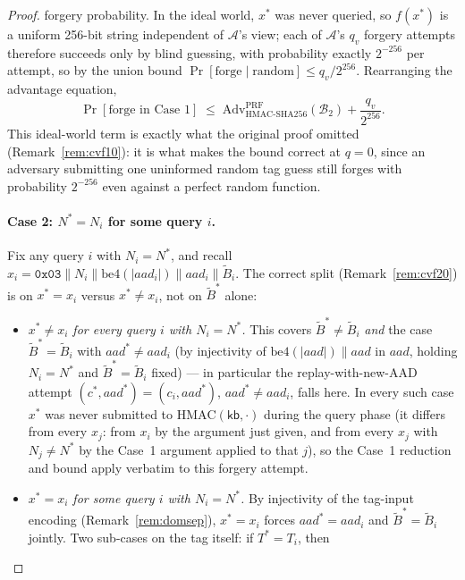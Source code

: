 \documentclass[11pt,a4paper]{article}
\begin{document}
\begin{proof}
forgery probability. In the ideal world, $x^*$ was never queried, so
$f(x^*)$ is a uniform 256-bit string independent of $\mathcal{A}$'s view;
each of $\mathcal{A}$'s $q_v$ forgery attempts therefore succeeds only by
blind guessing, with probability exactly $2^{-256}$ per attempt, so by the
union bound $\Pr[\text{forge}\mid\text{random}] \leq q_v/2^{256}$.
Rearranging the advantage equation,
\[
  \Pr[\text{forge in Case 1}]
  \;\leq\;
  \mathrm{Adv}^{\mathrm{PRF}}_{\mathrm{HMAC\text{-}SHA256}}(\mathcal{B}_2)
  + \frac{q_v}{2^{256}}.
\]
This ideal-world term is exactly what the original proof omitted
(Remark~\ref{rem:cvf10}): it is what makes the bound correct at $q=0$,
since an adversary submitting one uninformed random tag guess still
forges with probability $2^{-256}$ even against a perfect random
function.

\paragraph{Case 2: $N^* = N_i$ for some query $i$.}
Fix any query $i$ with $N_i = N^*$, and recall
$x_i = \texttt{0x03} \| N_i \| \mathrm{be4}(|aad_i|) \| aad_i \| \widetilde{B}_i$.
The correct split (Remark~\ref{rem:cvf20}) is on $x^* = x_i$ versus
$x^* \neq x_i$, not on $\widetilde{B}^*$ alone:
\begin{itemize}
  \item \emph{$x^* \neq x_i$ for every query $i$ with $N_i = N^*$.} This
        covers $\widetilde{B}^* \neq \widetilde{B}_i$ \emph{and} the
        case $\widetilde{B}^* = \widetilde{B}_i$ with $aad^* \neq aad_i$
        (by injectivity of $\mathrm{be4}(|aad|)\|aad$ in $aad$, holding
        $N_i=N^*$ and $\widetilde{B}^*=\widetilde{B}_i$ fixed) --- in
        particular the replay-with-new-AAD attempt
        $(c^*,aad^*)=(c_i,aad^*)$, $aad^*\neq aad_i$, falls here. In every
        such case $x^*$ was never submitted to
        $\mathrm{HMAC}(\mathsf{kb},\cdot)$ during the query phase (it
        differs from every $x_j$: from $x_i$ by the argument just given,
        and from every $x_j$ with $N_j \neq N^*$ by the Case~1 argument
        applied to that $j$), so the Case~1 reduction and bound apply
        verbatim to this forgery attempt.
  \item \emph{$x^* = x_i$ for some query $i$ with $N_i = N^*$.} By
        injectivity of the tag-input encoding (Remark~\ref{rem:domsep}),
        $x^*=x_i$ forces $aad^*=aad_i$ and $\widetilde{B}^*=\widetilde{B}_i$
        jointly. Two sub-cases on the tag itself: if $T^* = T_i$, then

\end{itemize}
\end{proof}
\end{document}

